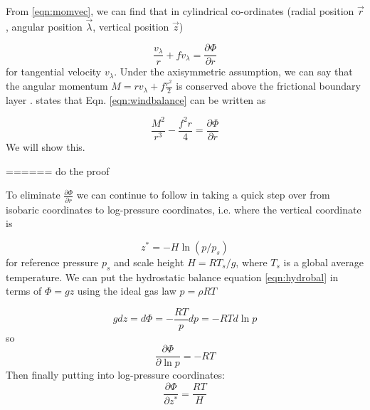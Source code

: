 




From \ref{eqn:momvec}, we can find that in cylindrical co-ordinates (radial position $\vec{r}$, angular position $\vec{\lambda}$, vertical position $\vec{z}$)

\begin{equation}
    \frac{v_{\lambda}}{r}+fv_{\lambda}=\frac{\partial \Phi}{\partial r}
    \label{eqn:windbalance}
\end{equation}
for tangential velocity $v_{\lambda}$. Under the axisymmetric assumption, we can say that the angular momentum $M=rv_{\lambda}+f\frac{r^2}{2}$ is conserved above the frictional boundary layer \cite{smith_montgomery_2017}. \cite{holton_hakim_2019} states that Eqn. \ref{eqn:windbalance} can be written as 

\begin{equation}
    \frac{M^2}{r^3}-\frac{f^2r}{4}=\frac{\partial\Phi}{\partial r}
    \label{eqn:windbalance_mom}
\end{equation}
We will show this. 

====== do the proof

To eliminate $\frac{\partial \Phi}{\partial r}$ we can continue to follow \cite{holton_hakim_2019} in taking a quick step over from isobaric coordinates to log-pressure coordinates, i.e. where the vertical coordinate is 

\begin{equation*}
    z^*=-H\ln(p/p_s)
\end{equation*}
for reference pressure $p_s$ and scale height $H=RT_s/g$, where $T_s$ is a global average temperature. We can put the hydrostatic balance equation \ref{eqn:hydrobal} in terms of $\Phi= gz$ using the ideal gas law $p=\rho RT$

\begin{equation*}
    gdz = d\Phi=-\frac{RT}{p}dp=-RTd\ln p
\end{equation*}
so
\begin{equation*}
    \frac{\partial\Phi}{\partial \ln p}=-RT
\end{equation*}
Then finally putting into log-pressure coordinates:
\begin{equation*}
    \frac{\partial \Phi}{\partial z^*}=\frac{RT}{H}
\end{equation*}

